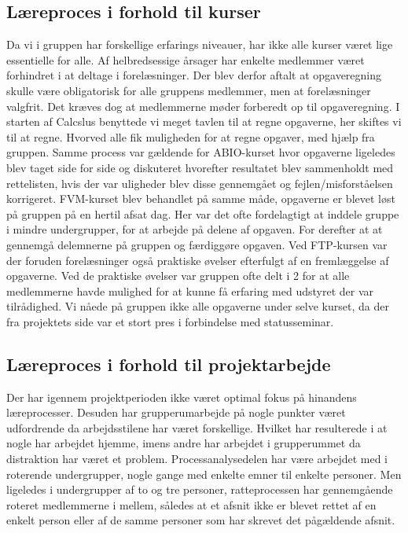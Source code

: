 \subsection{Læreproces i forhold til kurser}
Da vi i gruppen har forskellige erfarings niveauer, har ikke alle kurser været lige essentielle for alle. Af helbredsessige årsager har enkelte medlemmer været forhindret i at deltage i forelæsninger. Der blev derfor aftalt at opgaveregning skulle være obligatorisk for alle gruppens medlemmer, men at forelæsninger valgfrit. Det kræves dog at medlemmerne møder forberedt op til opgaveregning. I starten af Calcslus benyttede vi meget tavlen til at regne opgaverne, her skiftes vi til at regne. Hvorved alle fik muligheden for at regne opgaver, med hjælp fra gruppen. Samme process var gældende for ABIO-kurset hvor opgaverne ligeledes blev taget side for side og diskuteret hvorefter resultatet blev sammenholdt med rettelisten, hvis der var uligheder blev disse gennemgået og fejlen/misforståelsen korrigeret.
FVM-kurset blev behandlet på samme måde, opgaverne er blevet løst på gruppen på en hertil afsat dag. Her var det ofte fordelagtigt at inddele gruppe i mindre undergrupper, for at arbejde på delene af opgaven. For derefter at at gennemgå delemnerne på gruppen og færdiggøre opgaven. Ved FTP-kursen var der foruden forelæsninger også praktiske øvelser efterfulgt af en fremlæggelse af opgaverne. Ved de praktiske øvelser var gruppen ofte delt i 2 for at alle medlemmerne havde mulighed for at kunne få erfaring med udstyret der var tilrådighed. Vi nåede på gruppen ikke alle opgaverne under selve kurset, da der fra projektets side var et stort pres i forbindelse med statusseminar.  
\subsection{Læreproces i forhold til projektarbejde}
Der har igennem projektperioden ikke været optimal fokus på hinandens læreprocesser. Desuden har grupperumarbejde på nogle punkter været udfordrende da arbejdsstilene har været forskellige. Hvilket har resulterede i at nogle har arbejdet hjemme, imens andre har arbejdet i grupperummet da distraktion har været et problem. Processanalysedelen har være arbejdet med i roterende undergrupper, nogle gange med enkelte emner til enkelte personer. Men ligeledes i undergrupper af to og tre personer, ratteprocessen har gennemgående roteret medlemmerne i mellem, således at et afsnit ikke er blevet rettet af en enkelt person eller af de samme personer som har skrevet det pågældende afsnit. 
\clearpage
